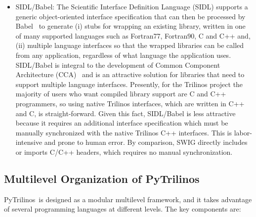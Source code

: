 \documentclass[acmtocl]{acmtrans2m}
\newcommand{\PyTrilinos}{{PyTrilinos}}
\begin{document}
\begin{itemize}
\item SIDL/Babel: The Scientific Interface Definition Language (SIDL)
  supports a generic object-oriented interface specification
  that can then be processed by Babel~\cite{Babel-home-page} to
  generate (i) stubs for wrapping an existing library, written in one
  of many supported languages such as Fortran77, Fortran90, C and C++
  and, (ii) multiple language interfaces so that the wrapped libraries
  can be called from any application, regardless of what language the
  application uses.  SIDL/Babel is integral to the development of
  Common Component Architecture (CCA)~\cite{cca} and is an attractive
  solution for libraries that need to support multiple language
  interfaces.  Presently, for the Trilinos project the majority of
  users who want compiled library support are C and C++ programmers,
  so using native Trilinos interfaces, which are written in C++ and C,
  is straight-forward.  Given this fact, SIDL/Babel is less attractive
  because it requires an additional interface specification which must
  be manually synchronized with the native Trilinos C++ interfaces.
  This is labor-intensive and prone to human error.  By comparison,
  SWIG directly includes or imports C/C++ headers, which requires no
  manual synchronization.

\end{itemize}

\subsection{Multilevel Organization of \PyTrilinos}
\label{sec:multilevel}

\PyTrilinos\ is designed as a modular multilevel framework, and it
takes advantage of several programming languages at different levels.
The key components are:
\end{document}

